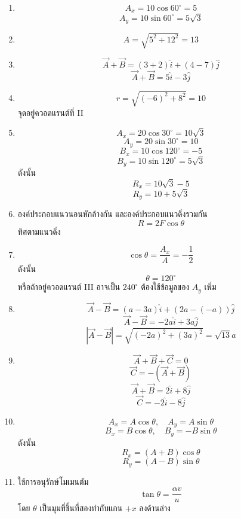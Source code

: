 \documentclass[12pt,a4paper]{report}
\begin{document}
\begin{enumerate}
    \item
    \[
    A_x=10\cos60^\circ=5
    \]
    \[
    A_y=10\sin60^\circ=5\sqrt{3}
    \]
    
    \item
    \[
    A=\sqrt{5^2+12^2}=13
    \]
    
    \item
    \[
    \vec{A}+\vec{B}=(3+2)\hat{i}+(4-7)\hat{j}
    \]
    \[
    \vec{A}+\vec{B}=5\hat{i}-3\hat{j}
    \]
    
    \item
    \[
    r=\sqrt{(-6)^2+8^2}=10
    \]
    จุดอยู่ควอดแรนต์ที่ II
    
    \item
    \[
    A_x=20\cos30^\circ=10\sqrt{3}
    \]
    \[
    A_y=20\sin30^\circ=10
    \]
    \[
    B_x=10\cos120^\circ=-5
    \]
    \[
    B_y=10\sin120^\circ=5\sqrt{3}
    \]
    ดังนั้น
    \[
    R_x=10\sqrt{3}-5
    \]
    \[
    R_y=10+5\sqrt{3}
    \]
    
    \item
    องค์ประกอบแนวนอนหักล้างกัน และองค์ประกอบแนวดิ่งรวมกัน
    \[
    R=2F\cos\theta
    \]
    ทิศตามแนวดิ่ง
    
    \item
    \[
    \cos\theta=\frac{A_x}{A}=-\frac{1}{2}
    \]
    ดังนั้น
    \[
    \theta=120^\circ
    \]
    หรือถ้าอยู่ควอดแรนต์ III อาจเป็น $240^\circ$ ต้องใช้ข้อมูลของ $A_y$ เพิ่ม
    
    \item
    \[
    \vec{A}-\vec{B}=(a-3a)\hat{i}+(2a-(-a))\hat{j}
    \]
    \[
    \vec{A}-\vec{B}=-2a\hat{i}+3a\hat{j}
    \]
    \[
    |\vec{A}-\vec{B}|=\sqrt{(-2a)^2+(3a)^2}=\sqrt{13}a
    \]
    
    \item
    \[
    \vec{A}+\vec{B}+\vec{C}=0
    \]
    \[
    \vec{C}=-(\vec{A}+\vec{B})
    \]
    \[
    \vec{A}+\vec{B}=2\hat{i}+8\hat{j}
    \]
    \[
    \vec{C}=-2\hat{i}-8\hat{j}
    \]
    
    \item
    \[
    A_x=A\cos\theta,\quad A_y=A\sin\theta
    \]
    \[
    B_x=B\cos\theta,\quad B_y=-B\sin\theta
    \]
    ดังนั้น
    \[
    R_x=(A+B)\cos\theta
    \]
    \[
    R_y=(A-B)\sin\theta
    \]
    
    \item
    ใช้การอนุรักษ์โมเมนตัม
    \[
    \tan\theta=\frac{\alpha v}{u}
    \]
    โดย $\theta$ เป็นมุมที่ชิ้นที่สองทำกับแกน $+x$ ลงด้านล่าง
    

\end{enumerate}
\end{document}
